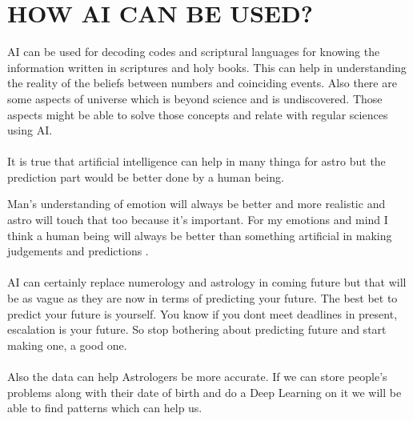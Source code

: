 \documentclass[a4paper,10pt]{article} %
\begin{document}
\section{\color{brown}HOW AI CAN BE USED?}
AI can be used for decoding codes and scriptural languages for knowing the information written in scriptures and holy books. This can help in understanding the reality of the beliefs between numbers and coinciding events. Also there are some aspects of universe which is beyond science and is undiscovered. Those aspects might be able to solve those concepts and relate with regular sciences using AI.\\\\It is true that artificial intelligence can help in many thinga for astro but the prediction part would be better done by a human being.

Man's understanding of emotion will always be better and more realistic and astro will touch that too because it's important. For my emotions and mind I think a human being will always be better than something artificial in making judgements and predictions .\\\\
AI can certainly replace numerology and astrology in coming future but that will be as vague as they are now in terms of predicting your future. The best bet to predict your future is yourself. You know if you dont meet deadlines in present, escalation is your future. So stop bothering about predicting future and start making one, a good one.\\\\
Also the data can help Astrologers be more accurate. If we can store people's problems along with their date of birth and do a Deep Learning on it we will be able to find patterns which can help us.


\printbibliography

\end{document}
